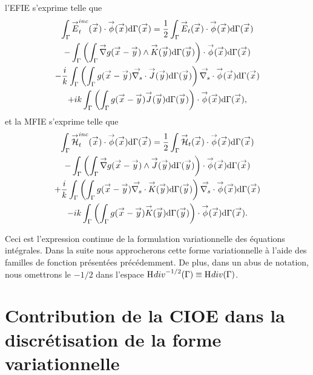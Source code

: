   l'EFIE s'exprime telle que
  \begin{multline}
    \label{eq:form_int:EFIE:var}
    \int_{\Gamma} \vE^{inc}_t(\vx) \cdot \vect{\phi}(\vx) \dd{\Gamma}(\vx) =
      \frac{1}{2} \int_{\Gamma} \vE_t(\vx) \cdot \vect{\phi}(\vx) \dd{\Gamma}(\vx) \\
        - \int_{\Gamma} \left( \int_{\Gamma} \vgrad g(\vx - \vy) \pvect \vK(\vy) \dd{\Gamma}(\vy) \right) \cdot \vect{\phi}(\vx) \dd{\Gamma}(\vx) \\
      - \frac{i}{k} \int_{\Gamma} \left( \int_{\Gamma}  g(\vx - \vy)\vdivs\vJ(\vy) \dd{\Gamma}(\vy) \right)\vdivs \vect{\phi}(\vx) \dd{\Gamma}(\vx) \\
        +  ik\int_{\Gamma} \left( \int_{\Gamma} g(\vx - \vy)\vJ(\vy) \dd{\Gamma}(\vy) \right) \cdot \vect{\phi}(\vx) \dd{\Gamma}(\vx),
  \end{multline}
  et la MFIE s'exprime telle que
  \begin{multline}
    \label{eq:form_int:MFIE:var}
    \int_{\Gamma} \vH^{inc}_t(\vx) \cdot \vect{\phi}(\vx) \dd{\Gamma}(\vx) =
      \frac{1}{2} \int_{\Gamma} \vH_t(\vx) \cdot \vect{\phi}(\vx) \dd{\Gamma}(\vx) \\
        - \int_{\Gamma} \left( \int_{\Gamma} \vgrad g(\vx - \vy) \pvect \vJ(\vy) \dd{\Gamma}(\vy) \right) \cdot \vect{\phi}(\vx) \dd{\Gamma}(\vx) \\
      + \frac{i}{k} \int_{\Gamma} \left( \int_{\Gamma}  g(\vx - \vy)\vdivs\vK(\vy) \dd{\Gamma}(\vy) \right)\vdivs \vect{\phi}(\vx) \dd{\Gamma}(\vx) \\
        -  ik\int_{\Gamma} \left( \int_{\Gamma} g(\vx - \vy)\vK(\vy) \dd{\Gamma}(\vy) \right) \cdot \vect{\phi}(\vx) \dd{\Gamma}(\vx).
  \end{multline}

  Ceci est l'expression continue de la formulation variationnelle des équations intégrales. Dans la suite nous approcherons cette forme variationnelle à l'aide des familles de fonction présentées précédemment. De plus, dans un abus de notation, nous omettrons le \(-1/2\) dans l'espace \(\Sobolev[div]^{-1/2}(\Gamma)\equiv\Sobolev[div](\Gamma)\).


\section{Contribution de la CIOE dans la discrétisation de la forme variationnelle}

